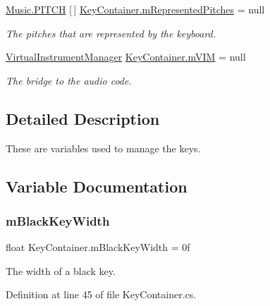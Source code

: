 \begin{DoxyCompactItemize}
\hyperlink{group___music_enums_ga508f69b199ea518f935486c990edac1d}{Music.\+P\+I\+T\+CH} \mbox{[}$\,$\mbox{]} \hyperlink{group___key_contain_priv_var_ga103945a6efe3469191e5253d13fec5be}{Key\+Container.\+m\+Represented\+Pitches} = null
\begin{DoxyCompactList}\small\item\em The pitches that are represented by the keyboard. \end{DoxyCompactList}\item 
\hyperlink{class_virtual_instrument_manager}{Virtual\+Instrument\+Manager} \hyperlink{group___key_contain_priv_var_ga57ee3824e2f284403bb70ad9c4dfd307}{Key\+Container.\+m\+V\+IM} = null
\begin{DoxyCompactList}\small\item\em The bridge to the audio code. \end{DoxyCompactList}\end{DoxyCompactItemize}


\subsection{Detailed Description}
These are variables used to manage the keys. 

\subsection{Variable Documentation}
\mbox{\label{group___key_contain_priv_var_ga6461d765c3904e6a3031558d7385be25}} 
\subsubsection{\texorpdfstring{m\+Black\+Key\+Width}{mBlackKeyWidth}}
{\footnotesize\ttfamily float Key\+Container.\+m\+Black\+Key\+Width = 0f\hspace{0.3cm}{\ttfamily [private]}}



The width of a black key. 



Definition at line 45 of file Key\+Container.\+cs.

\mbox{\label{group___key_contain_priv_var_ga01addf187bb12ffe824374df98e2c2d8}} 
